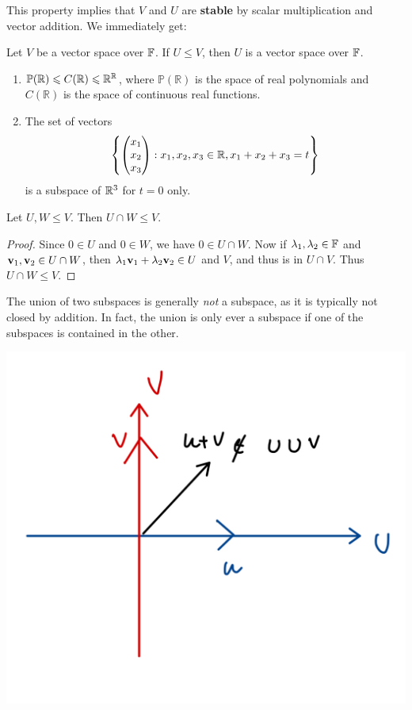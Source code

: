 \documentclass[a4paper]{article}
\begin{document}
This property implies that $V$ and $U$ are \textbf{stable} by scalar multiplication and vector addition. We immediately get:
\begin{proposition}
    Let $ V $ be a vector space over ${\mathbb{F}}$. If $ U\le V $, then $U$ is a vector space over ${\mathbb{F}}$.
\end{proposition}
\begin{example}
    \begin{enumerate}
        \item $ \mathbb{P}({\mathbb{R}})\leqslant C({\mathbb{R}})\leqslant \mathbb{R} ^\mathbb{R}  $, where $ \mathbb{P}(\mathbb{R}) $ is the space of real polynomials and $ C(\mathbb{R}) $ is the space of continuous real functions.
        \item The set of vectors
        $$
        \left\{\begin{pmatrix}x_1 \\ x_2 \\ x_3\end{pmatrix} : x_1, x_2, x_3 \in {\mathbb{R}}, x_1 + x_2 + x_3 = t\right\}
        $$
        is a subspace of ${\mathbb{R}}^3$ for $t = 0$ only.
    \end{enumerate}
\end{example}
\begin{proposition}
    Let $U, W \le V$. Then $U \cap W \le V$.
\end{proposition}
\begin{proof}
    Since $0 \in U$ and $0 \in W$, we have $0 \in U \cap W$. Now if $\lambda_1, \lambda_2 \in {\mathbb{F}}$ and ${\bf v}_1, {\bf v}_2 \in U \cap W$, then $\lambda_1 {\bf v}_1 + \lambda_2 {\bf v}_2 \in U$ and $V$, and thus is in $U \cap V$. Thus $U \cap W \le V$.
\end{proof}
The union of two subspaces is generally \emph{not} a subspace, as it is typically not closed by addition. In fact, the union is only ever a subspace if one of the subspaces is contained in the other. 
\begin{center}
    \includegraphics[scale=0.13]{la1.jpeg}
\end{center}
\end{document}
